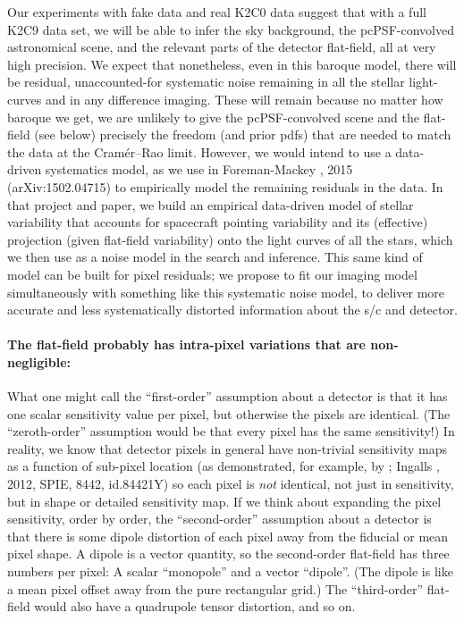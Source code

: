\documentclass[12pt,preprint]{aastex}
\begin{document}
Our experiments with fake data and real K2C0 data suggest that with a
full K2C9 data set, we will be able to infer the sky background, the
pcPSF-convolved astronomical scene, and the relevant parts of the
detector flat-field, all at very high precision.
We expect that nonetheless, even in this baroque model, there will
be residual, unaccounted-for systematic noise remaining in all the
stellar light-curves and in any difference imaging.
These will remain because no matter how baroque we get, we are
unlikely to give the pcPSF-convolved scene and the flat-field (see
below) precisely the freedom (and prior pdfs) that are needed to match
the data at the Cram\'er--Rao limit.
However, we would intend to use a data-driven systematics model, as we
use in Foreman-Mackey \etal, 2015 (arXiv:1502.04715) to empirically
model the remaining residuals in the data.
In that project and paper, we build an empirical data-driven model of
stellar variability that accounts for spacecraft pointing variability
and its (effective) projection (given flat-field variability) onto the
light curves of all the stars, which we then use as a noise model in
the search and inference.
This same kind of model can be built for pixel residuals;
we propose to fit our imaging model simultaneously with something like this systematic
noise model, to deliver more accurate and less systematically distorted
information about the s/c and detector.

\paragraph{The flat-field probably has intra-pixel variations that are non-negligible:}

What one might call the ``first-order'' assumption about a detector is
that it has one scalar sensitivity value per pixel, but otherwise the
pixels are identical.
(The ``zeroth-order'' assumption would be that every pixel has the same
sensitivity!)
In reality, we know that detector pixels in general have non-trivial sensitivity maps as a
function of sub-pixel location (as demonstrated, for example, by \spitzer;
Ingalls \etal, 2012, SPIE, 8442, id.84421Y)
so each pixel is \emph{not} identical,
not just in sensitivity, but in shape or detailed sensitivity map.
If we think about expanding the pixel sensitivity, order by order, the
``second-order'' assumption about a detector is that there is some dipole
distortion of each pixel away from the fiducial or mean pixel shape.
A dipole is a vector quantity, so the second-order flat-field has
three numbers per pixel: A scalar ``monopole'' and a vector
``dipole''.
(The dipole is like a mean pixel offset away from the pure rectangular
grid.)
The ``third-order'' flat-field would also have a quadrupole tensor
distortion, and so on.
\end{document}
